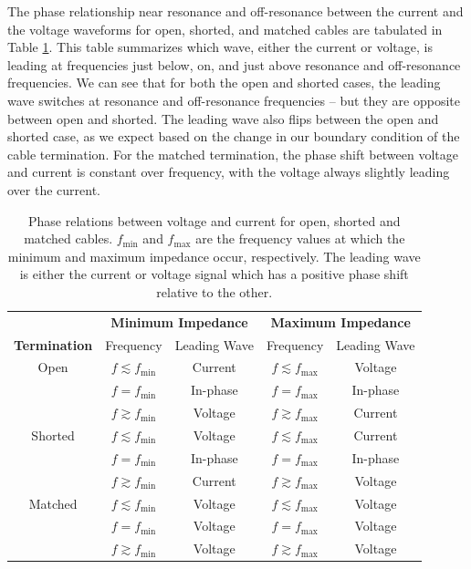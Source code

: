 The phase relationship near resonance and off-resonance between the current and the voltage waveforms for open, shorted, and matched cables are tabulated in Table \ref{tab:phase_relations}. This table summarizes which wave, either the current or voltage, is leading at frequencies just below, on, and just above resonance and off-resonance frequencies. We can see that for both the open and shorted cases, the leading wave switches at resonance and off-resonance frequencies -- but they are opposite between open and shorted. The leading wave also flips between the open and shorted case, as we expect based on the change in our boundary condition of the cable termination. For the matched termination, the phase shift between voltage and current is constant over frequency, with the voltage always slightly leading over the current.\\
\begin{table}[H]
    \centering
    \begin{tabular}{c||c|c||c|c}
         &  \multicolumn{2}{c}{\textbf{Minimum Impedance}} &  \multicolumn{2}{c}{\textbf{Maximum Impedance}} \\
        \textbf{Termination} & Frequency & Leading Wave & Frequency & Leading Wave \\ \midrule
        Open & $f \lesssim f_\text{min}$ & Current & $f \lesssim f_\text{max}$ & Voltage \\
        
        & $f=f_\text{min}$ & In-phase & $f=f_\text{max}$ & In-phase \\
        
        & $f\gtrsim f_\text{min}$ & Voltage & $f\gtrsim f_\text{max}$ & Current\\ \midrule
        
        Shorted & $f \lesssim f_\text{min}$ & Voltage & $f \lesssim f_\text{max}$ & Current \\
        & $f=f_\text{min}$ & In-phase & $f=f_\text{max}$ & In-phase \\
        & $f\gtrsim f_\text{min}$ & Current & $f\gtrsim f_\text{max}$ & Voltage \\ \midrule
        
        Matched & $f \lesssim f_\text{min}$ & Voltage & $f \lesssim f_\text{max}$ & Voltage \\
        & $f=f_\text{min}$ &Voltage & $f=f_\text{max}$ & Voltage \\
        & $f\gtrsim f_\text{min}$ & Voltage & $f\gtrsim f_\text{max}$ & Voltage \\ \midrule
    \end{tabular}
    \caption{Phase relations between voltage and current for open, shorted and matched cables. $f_\text{min}$ and $f_\text{max}$ are the frequency values at which the minimum and maximum impedance occur, respectively. The leading wave is either the current or voltage signal which has a positive phase shift relative to the other.}
    \label{tab:phase_relations}
\end{table}

